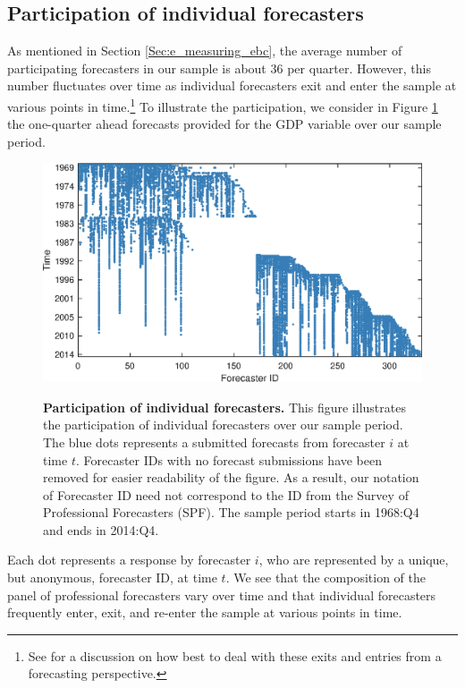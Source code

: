 \documentclass[12pt,a4paper,onecolumn,oneside,notitlepage]{article}
\begin{document}
\begin{appendices}

\clearpage
\section{Participation of individual forecasters}\label{sec:e_participation_of_individual_forecasters}
As mentioned in Section \ref{Sec:e_measuring_ebc}, the average number of participating forecasters in our sample is about $36$ per quarter. However, this number fluctuates over time as individual forecasters exit and enter the sample at various points in time.\footnote{See \cite{CapistranTimmermann2009} for a discussion on how best to deal with these exits and entries from a forecasting perspective.} To illustrate the participation, we consider in Figure \ref{Fig:e_participating_forecasters} the one-quarter ahead forecasts provided for the GDP variable over our sample period. 
\begin{figure}[htbp]
    \caption{
        \textbf{Participation of individual forecasters.} \newline
        This figure illustrates the participation of individual forecasters over our sample period. The blue dots represents a submitted forecasts from forecaster $i$ at time $t$. Forecaster IDs with no forecast submissions have been removed for easier readability of the figure. As a result, our notation of Forecaster ID need not correspond to the ID from the Survey of Professional Forecasters (SPF). The sample period starts in 1968:Q4 and ends in 2014:Q4.
    }
    \centering
    \includegraphics[scale=0.8]{Figures/e_participating_forecasters.eps}
    \label{Fig:e_participating_forecasters}
\end{figure}
Each dot represents a response by forecaster $i$, who are represented by a unique, but anonymous, forecaster ID, at time $t$. We see that the composition of the panel of professional forecasters vary over time and that individual forecasters frequently enter, exit, and re-enter the sample at various points in time. 

\end{appendices}
\end{document}
